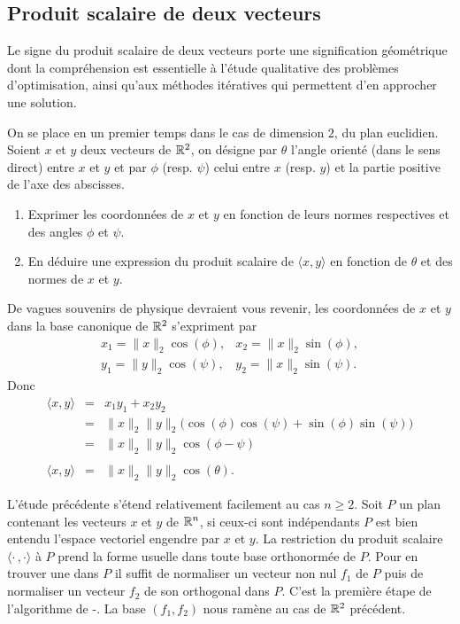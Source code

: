 \documentclass[11pt, a4paper]{article}
\begin{document}
\subsection{Produit scalaire de deux vecteurs}

Le signe du produit scalaire de deux vecteurs porte une signification
géométrique dont la compréhension est essentielle à l'étude
qualitative des problèmes d'optimisation, ainsi qu'aux méthodes
itératives qui permettent d'en approcher une solution.

On se place en un premier temps dans le cas de dimension $2$, du plan
euclidien. Soient $x$ et $y$ deux vecteurs de $\mathbb{R}^2$, on
désigne par $\theta$ l'angle orienté (dans le sens direct) entre $x$
et $y$ et par $\phi$ (resp. $\psi$) celui entre $x$ (resp. $y$) et la
partie positive de l'axe des abscisses.
\begin{question}
  \begin{enumerate}
  \item Exprimer les coordonnées de $x$ et $y$ en fonction de leurs
    normes respectives et des angles $\phi$ et $\psi$.
  \item En déduire une expression du produit scalaire de
    $\langle x, y \rangle$ en fonction de $\theta$ et des normes de $x$
    et $y$.
  \end{enumerate}
\end{question}
\begin{solution}
  De vagues souvenirs de
  physique devraient vous revenir, les coordonnées de $x$ et $y$ dans la
  base canonique de $\mathbb{R}^2$ s'expriment par
  \[
    \begin{matrix}
      x_1 = \|x\|_2\cos(\phi), & x_2 = \|x\|_2\sin(\phi), \\
      y_1 = \|y\|_2\cos(\psi), & y_2 = \|x\|_2\sin(\psi).
    \end{matrix}
  \]
  Donc
  \[
    \begin{array}{rcl}
      \langle x, y \rangle & = & x_1y_1 + x_2y_2 \\
                           & = & \|x\|_2\|y\|_2\big(\cos(\phi)\cos(\psi) + \sin(\phi)\sin(\psi)\big) \\
                           & = & \|x\|_2\|y\|_2\cos(\phi - \psi) \\ \\
      \langle x, y \rangle & = & \|x\|_2\|y\|_2\cos(\theta).
    \end{array}
  \]
\end{solution}

L'étude précédente s'étend relativement facilement au cas $n \geq
2$. Soit $P$ un plan contenant les vecteurs $x$ et $y$ de
$\mathbb{R}^n$, si ceux-ci sont indépendants $P$ est bien entendu
l'espace vectoriel engendre par $x$ et $y$. La restriction du produit
scalaire $\langle \cdot\, , \cdot\rangle$ à $P$ prend la forme usuelle
dans toute base orthonormée de $P$. Pour en trouver une dans $P$ il
suffit de normaliser un vecteur non nul $f_1$ de $P$ puis de
normaliser un vecteur $f_2$ de son orthogonal dans $P$. C'est la
première étape de l'algorithme de -. La base
$(f_1, f_2)$ nous ramène au cas de $\mathbb{R}^2$ précédent.
\end{document}
